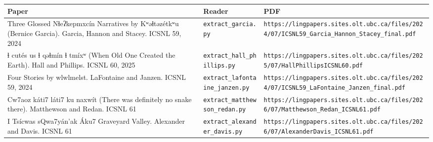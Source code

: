 \tiny
\setlength{\tabcolsep}{2pt}
\begin{longtable}{@{}>{\raggedright\arraybackslash}p{}>{\raggedright\arraybackslash}p{}>{\raggedright\arraybackslash}p{}@{}}
\toprule
Paper & Reader & PDF \\
\midrule
Three Glossed Nɬeʔkepmxcín Narratives by Kʷəɬtəzétkʷu (Bernice Garcia). Garcia, Hannon and Stacey. ICSNL 59, 2024 & \texttt{extract\_\allowbreak{}garcia.\allowbreak{}py} & \texttt{https:/\allowbreak{}/\allowbreak{}lingpapers.\allowbreak{}sites.\allowbreak{}olt.\allowbreak{}ubc.\allowbreak{}ca/\allowbreak{}files/\allowbreak{}2024/\allowbreak{}07/\allowbreak{}ICSNL59\_\allowbreak{}Garcia\_\allowbreak{}Hannon\_\allowbreak{}Stacey\_\allowbreak{}final.\allowbreak{}pdf} \\
ɬ cutés us ɬ qəɬmín ɬ tmíxʷ (When Old One Created the Earth). Hall and Phillips. ICSNL 60, 2025 & \texttt{extract\_\allowbreak{}hall\_\allowbreak{}phillips.\allowbreak{}py} & \texttt{https:/\allowbreak{}/\allowbreak{}lingpapers.\allowbreak{}sites.\allowbreak{}olt.\allowbreak{}ubc.\allowbreak{}ca/\allowbreak{}files/\allowbreak{}2025/\allowbreak{}07/\allowbreak{}Hall\allowbreak{}Phillips\allowbreak{}ICSNL60.\allowbreak{}pdf} \\
Four Stories by wlwlmelst. LaFontaine and Janzen. ICSNL 59, 2024 & \texttt{extract\_\allowbreak{}lafontaine\_\allowbreak{}janzen.\allowbreak{}py} & \texttt{https:/\allowbreak{}/\allowbreak{}lingpapers.\allowbreak{}sites.\allowbreak{}olt.\allowbreak{}ubc.\allowbreak{}ca/\allowbreak{}files/\allowbreak{}2024/\allowbreak{}07/\allowbreak{}ICSNL59\_\allowbreak{}La\allowbreak{}Fontaine\_\allowbreak{}Janzen\_\allowbreak{}final.\allowbreak{}pdf} \\
Cw7aoz káti7 láti7 ku naxwít (There was definitely no snake there). Matthewson and Redan. ICSNL 61 & \texttt{extract\_\allowbreak{}matthewson\_\allowbreak{}redan.\allowbreak{}py} & \texttt{https:/\allowbreak{}/\allowbreak{}lingpapers.\allowbreak{}sites.\allowbreak{}olt.\allowbreak{}ubc.\allowbreak{}ca/\allowbreak{}files/\allowbreak{}2026/\allowbreak{}07/\allowbreak{}Matthewson\_\allowbreak{}Redan\_\allowbreak{}ICSNL61.\allowbreak{}pdf} \\
I Tsícwas sQwa7yán'ak Áku7 Graveyard Valley. Alexander and Davis. ICSNL 61 & \texttt{extract\_\allowbreak{}alexander\_\allowbreak{}davis.\allowbreak{}py} & \texttt{https:/\allowbreak{}/\allowbreak{}lingpapers.\allowbreak{}sites.\allowbreak{}olt.\allowbreak{}ubc.\allowbreak{}ca/\allowbreak{}files/\allowbreak{}2026/\allowbreak{}07/\allowbreak{}Alexander\allowbreak{}Davis\_\allowbreak{}ICSNL61.\allowbreak{}pdf} \\

\end{longtable}
